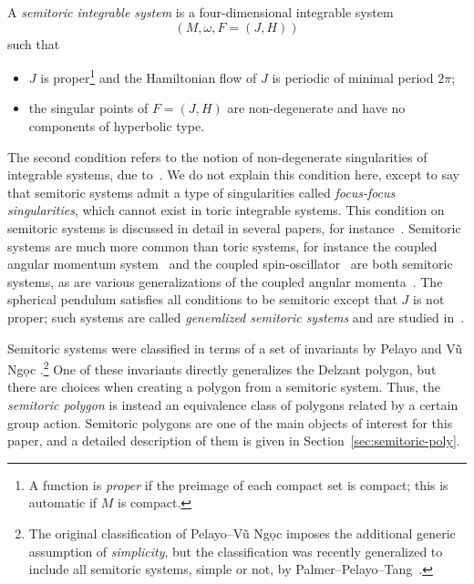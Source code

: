 \documentclass[pdftex]{sigma}
\numberwithin{equation}{section}
\newcommand{\om}{\omega}
\begin{document}
\begin{Definition} \label{def:semitoricsystem}
A \emph{semitoric integrable system} is a four-dimensional integrable system \[(M,\om,F=(J,H))\] such that
\begin{itemize}\itemsep=0pt
 \item $J$ is proper\footnote{A function is \emph{proper} if the preimage of each compact set is compact; this is automatic if $M$ is compact.} and the Hamiltonian flow of $J$ is periodic of minimal period $2\pi$;
 \item the singular points of $F=(J,H)$ are non-degenerate and have no components of hyperbolic type.
\end{itemize}
\end{Definition}

The second condition refers to the notion of non-degenerate singularities of integrable systems, due to~\cite{Bolsinov-Fomenko}.
We do not explain this condition here, except to say that semitoric systems admit a type of singularities called \emph{focus-focus singularities}, which cannot exist in toric integrable systems. This condition on semitoric systems is discussed in detail in several papers, for instance~\cite[Sections 2.1--2.4]{LFPal}.
Semitoric systems are much more common than toric systems, for instance the coupled angular momentum system~\cite{ADH-momenta,LFP,SaZh1999} and the coupled spin-oscillator~\cite{ADH-spin-osc,PVN-spin-osc} are both semitoric systems, as are various generalizations of the coupled angular momenta~\cite{AHP-twist,HoPa2017}.
The spherical pendulum satisfies all conditions to be semitoric except that $J$ is not proper; such systems are called \emph{generalized semitoric systems} and are studied in~\cite{PeRaVN2015}.

Semitoric systems were classified in terms of a set of invariants by Pelayo and V\~{u} Ng\d{o}c \cite{PeVN2009,PeVN2011}.\footnote{The original classification of Pelayo--V\~{u} Ng\d{o}c imposes the additional generic assumption of \emph{simplicity}, but the classification was recently generalized to include all semitoric systems, simple or not, by Palmer--Pelayo--Tang~\cite{PPT-nonsimple}.}
One of these invariants directly generalizes the Delzant polygon, but there are choices when creating a polygon from a semitoric system. Thus, the \emph{semitoric polygon} is instead an equivalence class of polygons related by a certain group action.
Semitoric polygons are one of the main objects of interest for this paper, and a detailed description of them is given in Section~\ref{sec:semitoric-poly}.
\end{document}
